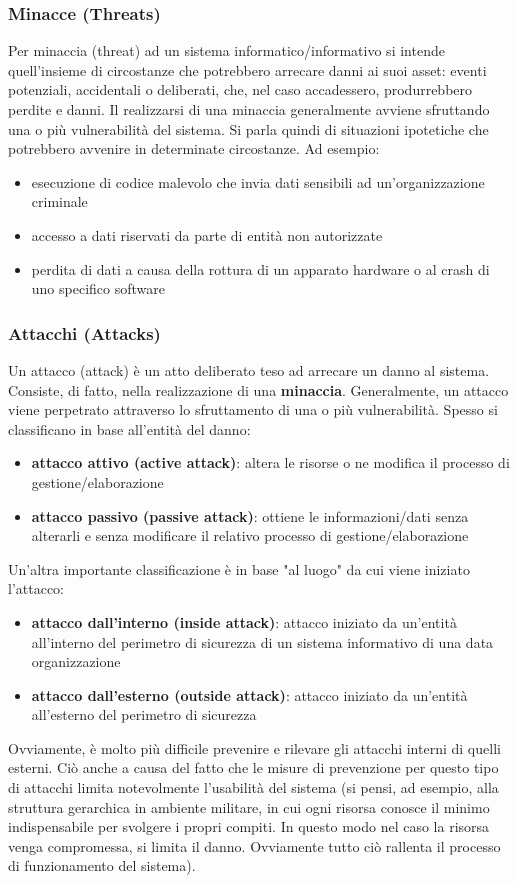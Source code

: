 \subsubsection{Minacce (Threats)}
Per minaccia (threat) ad un sistema informatico/informativo si intende quell'insieme di circostanze che potrebbero arrecare danni ai suoi asset: eventi potenziali, accidentali o deliberati, che, nel caso accadessero, produrrebbero perdite e danni. Il realizzarsi di una minaccia generalmente avviene sfruttando una o più vulnerabilità del sistema.  Si parla quindi di situazioni ipotetiche che potrebbero avvenire in determinate circostanze. Ad esempio:
\begin{itemize} 
  \item esecuzione di codice malevolo che invia dati sensibili ad un'organizzazione criminale
  \item accesso a dati riservati da parte di entità non autorizzate
  \item perdita di dati a causa della rottura di un apparato hardware o al crash di uno specifico software
\end{itemize}

\subsubsection{Attacchi (Attacks)}
Un attacco (attack) è un atto deliberato teso ad arrecare un danno al sistema. Consiste, di fatto, nella realizzazione di una \textbf{minaccia}. Generalmente, un attacco viene perpetrato attraverso lo sfruttamento di una o più vulnerabilità. Spesso si classificano in base all’entità del danno:
\begin{itemize} 
  \item \textbf{attacco attivo (active attack)}: altera le risorse o ne modifica il processo di gestione/elaborazione
  \item \textbf{attacco passivo (passive attack)}: ottiene le informazioni/dati senza alterarli e senza modificare il relativo processo di
gestione/elaborazione
\end{itemize}
Un’altra importante classificazione è in base "al luogo" da cui viene iniziato l’attacco:
\begin{itemize} 
  \item \textbf{attacco dall'interno (inside attack)}: attacco iniziato da un'entità all'interno del perimetro di sicurezza di un sistema informativo di una data organizzazione
  \item \textbf{attacco dall'esterno (outside attack)}: attacco iniziato da un'entità all'esterno del perimetro di sicurezza
\end{itemize}
Ovviamente, è molto più difficile prevenire e rilevare gli attacchi interni di quelli esterni. Ciò anche a causa del fatto che le misure di prevenzione per questo tipo di attacchi limita notevolmente l'usabilità del sistema (si pensi, ad esempio, alla struttura gerarchica in ambiente militare, in cui ogni risorsa conosce il minimo indispensabile per svolgere i propri compiti. In questo modo nel caso la risorsa venga compromessa, si limita il danno. Ovviamente tutto ciò rallenta il processo di funzionamento del sistema).

